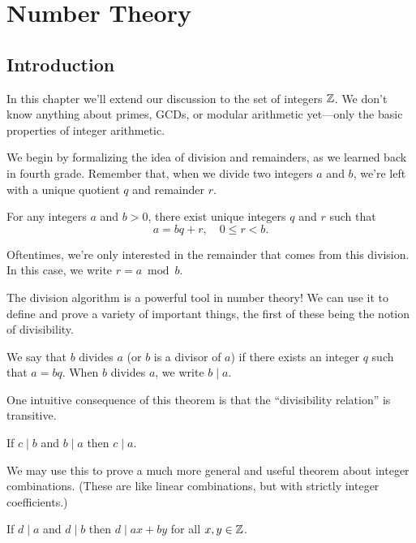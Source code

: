 \documentclass[../m55main.tex]{subfiles}
\begin{document}
\chapter{Number Theory}

\section{Introduction}
In this chapter we'll extend our discussion to the set of integers $\mathbb{Z}$.
We don't know anything about primes, GCDs, or modular arithmetic yet---only the basic properties of integer arithmetic.

We begin by formalizing the idea of division and remainders, as we learned back in fourth grade.
Remember that, when we divide two integers $a$ and $b$, we're left with a unique quotient $q$ and remainder $r$.

\begin{theorem}
    For any integers $a$ and $b > 0$, there exist unique integers $q$ and $r$ such that
    \[ a = bq + r, \quad 0 \leq r < b. \]
\end{theorem}


Oftentimes, we're only interested in the remainder that comes from this division.
In this case, we write $r = a \bmod b$.

The division algorithm is a powerful tool in number theory!
We can use it to define and prove a variety of important things, the first of these being the notion of divisibility.

\begin{definition}[Divisibility]
    We say that $b$ divides $a$ (or $b$ is a divisor of $a$) if there exists an integer $q$ such that $a = bq$.
    When $b$ divides $a$, we write $b \mid a$.
\end{definition}

One intuitive consequence of this theorem is that the ``divisibility relation'' is transitive.

\begin{theorem}
    If $c \mid b$ and $b \mid a$ then $c \mid a$.
\end{theorem}


We may use this to prove a much more general and useful theorem about integer combinations.
(These are like linear combinations, but with strictly integer coefficients.)

\begin{theorem}
    If $d \mid a$ and $d \mid b$ then $d \mid ax + by$ for all $x,y \in \mathbb{Z}$.
\end{theorem}
\end{document}
